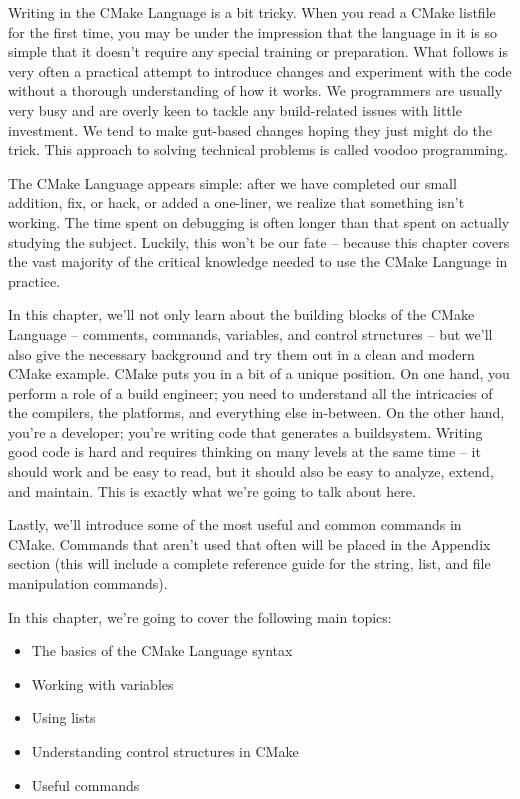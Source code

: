Writing in the CMake Language is a bit tricky. When you read a CMake listfile for
the first time, you may be under the impression that the language in it is so simple
that it doesn't require any special training or preparation. What follows is very often
a practical attempt to introduce changes and experiment with the code without
a thorough understanding of how it works. We programmers are usually very busy and
are overly keen to tackle any build-related issues with little investment. We tend to make
gut-based changes hoping they just might do the trick. This approach to solving technical
problems is called voodoo programming.

The CMake Language appears simple: after we have completed our small addition, fix,
or hack, or added a one-liner, we realize that something isn't working. The time spent on
debugging is often longer than that spent on actually studying the subject. Luckily, this
won't be our fate – because this chapter covers the vast majority of the critical knowledge
needed to use the CMake Language in practice.

In this chapter, we'll not only learn about the building blocks of the CMake Language – comments, commands, variables, and control structures – but we'll also give the necessary background and try them out in a clean and modern CMake example. CMake puts you in a bit of a unique position. On one hand, you perform a role of a build engineer; you need to understand all the intricacies of the compilers, the platforms, and everything else in-between. On the other hand, you're a developer; you're writing code that generates a buildsystem. Writing good code is hard and requires thinking on many levels at the same time – it should work and be easy to read, but it should also be easy to analyze, extend, and maintain. This is exactly what we're going to talk about here.

Lastly, we'll introduce some of the most useful and common commands in CMake. Commands that aren't used that often will be placed in the Appendix section (this will include a complete reference guide for the string, list, and file manipulation commands).

In this chapter, we're going to cover the following main topics:

\begin{itemize}
\item 
The basics of the CMake Language syntax

\item 
Working with variables

\item 
Using lists

\item 
Understanding control structures in CMake

\item 
Useful commands
\end{itemize}